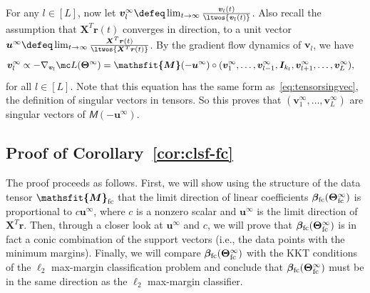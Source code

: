 \documentclass{article} %
\def\vr{{\bm{r}}}
\def\vu{{\bm{u}}}
\def\vv{{\bm{v}}}
\def\mI{{\bm{I}}}
\def\mX{{\bm{X}}}
\newcommand{\tens}[1]{\bm{\mathsfit{#1}}}
\def\tM{{\tens{M}}}
\newcommand{\vbeta}{{\bm{\beta}}}
\newcommand{\vbetafc}{\vbeta_{\rm fc}}
\newcommand{\bTheta}{\bm{\Theta}}
\newcommand{\bThetafc}{\bTheta_{\rm fc}}
\newcommand{\tMfc}{\tM_{\rm fc}}
\begin{document}
For any $l\in[L]$, now let $\vv_l^\infty\defeq \lim_{t \to \infty} \frac{\vv_l(t)}{\ltwos{\vv_l(t)}}$. Also recall the assumption that $\mX^T\vr(t)$ converges in direction, to a unit vector $\vu^\infty \defeq \lim_{t\to\infty} \frac{\mX^T \vr(t)}{\ltwos{\mX^T\vr(t)}}$. By the gradient flow dynamics of $\vv_l$, we have
\begin{align*}
    \vv_l^\infty
    &\propto -\nabla_{\vv_l} \mc L(\bTheta^\infty)
    = \tM(-\vu^\infty) \circ (\vv_1^\infty, \dots, \vv_{l-1}^\infty, \mI_{k_l}, \vv_{l+1}^\infty, \dots, \vv_L^\infty),
\end{align*}
for all $l \in [L]$. Note that this equation has the same form as~\eqref{eq:tensorsingvec}, the definition of singular vectors in tensors. So this proves that $(\vv_1^\infty, \dots, \vv_L^\infty)$ are singular vectors of $\tM(-\vu^\infty)$.

\subsection{Proof of Corollary~\ref{cor:clsf-fc}}
\label{sec:proof-cor-clsf-fc}
The proof proceeds as follows. First, we will show using the structure of the data tensor $\tMfc$ that the limit direction of linear coefficients $\vbetafc(\bThetafc^\infty)$ is proportional to $c \vu^\infty$, where $c$ is a nonzero scalar and $\vu^\infty$ is the limit direction of $\mX^T\vr$. Then, through a closer look at $\vu^\infty$ and $c$, we will prove that $\vbetafc(\bThetafc^\infty)$ is in fact a conic combination of the support vectors (i.e., the data points with the minimum margins). Finally, we will compare $\vbetafc(\bThetafc^\infty)$ with the KKT conditions of the $\ell_2$ max-margin classification problem and conclude that $\vbetafc(\bThetafc^\infty)$ must be in the same direction as the $\ell_2$ max-margin classifier.
\end{document}
